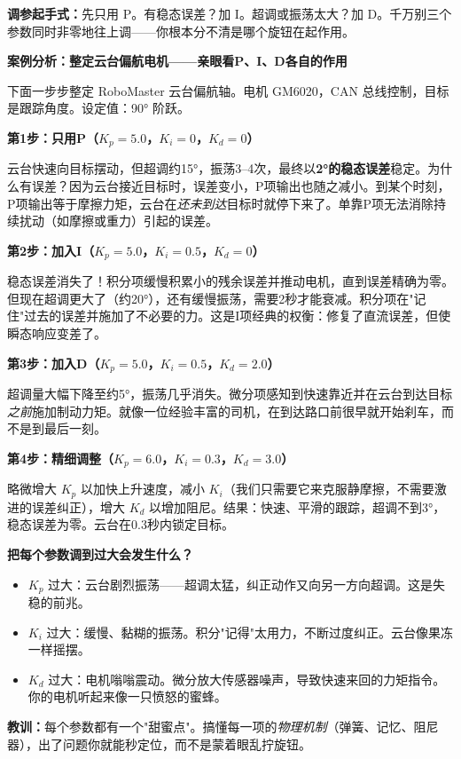 \textbf{调参起手式：}先只用 P。有稳态误差？加 I。超调或振荡太大？加 D。千万别三个参数同时非零地往上调——你根本分不清是哪个旋钮在起作用。

\vspace{0.5em}
\begin{mdframed}[linewidth=1pt, innertopmargin=10pt, innerbottommargin=10pt]
\textbf{案例分析：整定云台偏航电机——亲眼看P、I、D各自的作用}

\vspace{0.3em}
下面一步步整定 RoboMaster 云台偏航轴。电机 GM6020，CAN 总线控制，目标是跟踪角度。设定值：90° 阶跃。

\textbf{第1步：只用P（$K_p = 5.0$，$K_i = 0$，$K_d = 0$）}

云台快速向目标摆动，但超调约15°，振荡3--4次，最终以\textbf{2°的稳态误差}稳定。为什么有误差？因为云台接近目标时，误差变小，P项输出也随之减小。到某个时刻，P项输出等于摩擦力矩，云台在\textit{还未到达}目标时就停下来了。单靠P项无法消除持续扰动（如摩擦或重力）引起的误差。

\textbf{第2步：加入I（$K_p = 5.0$，$K_i = 0.5$，$K_d = 0$）}

稳态误差消失了！积分项缓慢积累小的残余误差并推动电机，直到误差精确为零。但现在超调更大了（约20°），还有缓慢振荡，需要2秒才能衰减。积分项在"记住"过去的误差并施加了不必要的力。这是I项经典的权衡：修复了直流误差，但使瞬态响应变差了。

\textbf{第3步：加入D（$K_p = 5.0$，$K_i = 0.5$，$K_d = 2.0$）}

超调量大幅下降至约5°，振荡几乎消失。微分项感知到快速靠近并在云台到达目标\textit{之前}施加制动力矩。就像一位经验丰富的司机，在到达路口前很早就开始刹车，而不是到最后一刻。

\textbf{第4步：精细调整（$K_p = 6.0$，$K_i = 0.3$，$K_d = 3.0$）}

略微增大 $K_p$ 以加快上升速度，减小 $K_i$（我们只需要它来克服静摩擦，不需要激进的误差纠正），增大 $K_d$ 以增加阻尼。结果：快速、平滑的跟踪，超调不到3°，稳态误差为零。云台在0.3秒内锁定目标。

\textbf{把每个参数调到过大会发生什么？}
\begin{itemize}[nosep]
    \item $K_p$ 过大：云台剧烈振荡——超调太猛，纠正动作又向另一方向超调。这是失稳的前兆。
    \item $K_i$ 过大：缓慢、黏糊的振荡。积分"记得"太用力，不断过度纠正。云台像果冻一样摇摆。
    \item $K_d$ 过大：电机嗡嗡震动。微分放大传感器噪声，导致快速来回的力矩指令。你的电机听起来像一只愤怒的蜜蜂。
\end{itemize}

\textbf{教训：}每个参数都有一个"甜蜜点"。搞懂每一项的\textit{物理机制}（弹簧、记忆、阻尼器），出了问题你就能秒定位，而不是蒙着眼乱拧旋钮。
\end{mdframed}

